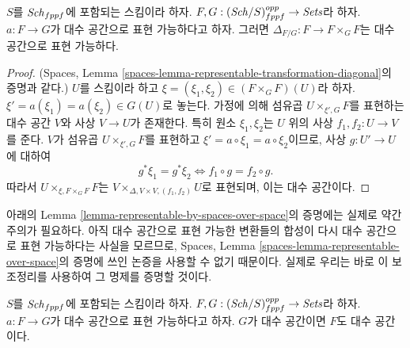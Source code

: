 \begin{lemma}
\label{lemma-representable-by-spaces-transformation-diagonal}
$S$를 $\mathit{Sch}_{fppf}$에 포함되는 스킴이라 하자.
$F, G : (\mathit{Sch}/S)_{fppf}^{opp} \to \textit{Sets}$라 하자.
$a : F \to G$가 대수 공간으로 표현 가능하다고 하자.
그러면 $\Delta_{F/G} : F \to F \times_G F$는 대수 공간으로
표현 가능하다.
\end{lemma}

\begin{proof}
(Spaces, Lemma
\ref{spaces-lemma-representable-transformation-diagonal}의 증명과 같다.)
$U$를 스킴이라 하고 $\xi = (\xi_1, \xi_2) \in (F \times_G F)(U)$라 하자.
$\xi' = a(\xi_1) = a(\xi_2) \in G(U)$로 놓는다.
가정에 의해 섬유곱 $U \times_{\xi', G} F$를 표현하는 대수 공간 $V$와
사상 $V \to U$가 존재한다. 특히 원소 $\xi_1, \xi_2$는 $U$ 위의 사상
$f_1, f_2 : U \to V$를 준다. $V$가 섬유곱
$U \times_{\xi', G} F$를 표현하고
$\xi' = a \circ \xi_1 = a \circ \xi_2$이므로, 사상 $g : U' \to U$에
대하여
$$
g^*\xi_1 = g^*\xi_2
\Leftrightarrow
f_1 \circ g = f_2 \circ g.
$$
따라서 $U \times_{\xi, F \times_G F} F$는
$V \times_{\Delta, V \times V, (f_1, f_2)} U$로 표현되며,
이는 대수 공간이다.
\end{proof}

\noindent
아래의 Lemma \ref{lemma-representable-by-spaces-over-space}의 증명에는
실제로 약간 주의가 필요하다. 아직 대수 공간으로 표현 가능한 변환들의
합성이 다시 대수 공간으로 표현 가능하다는 사실을 모르므로,
Spaces, Lemma \ref{spaces-lemma-representable-over-space}의 증명에 쓰인
논증을 사용할 수 없기 때문이다. 실제로 우리는 바로 이 보조정리를
사용하여 그 명제를 증명할 것이다.

\begin{lemma}
\label{lemma-representable-by-spaces-over-space}
$S$를 $\mathit{Sch}_{fppf}$에 포함되는 스킴이라 하자.
$F, G : (\mathit{Sch}/S)_{fppf}^{opp} \to \textit{Sets}$라 하자.
$a : F \to G$가 대수 공간으로 표현 가능하다고 하자.
$G$가 대수 공간이면 $F$도 대수 공간이다.
\end{lemma}


